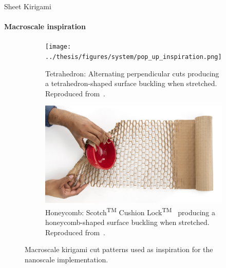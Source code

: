 \documentclass[
	10pt, %
]{beamer}
\begin{document}
%
%
\begin{frame}{Sheet Kirigami}
	\framesubtitle{Macroscale inspiration}
	\vspace*{5mm}
	\begin{figure}[H]
		\centering
		\begin{subfigure}[t]{0.48\textwidth}
			\centering
			\texttt{[image: ../thesis/figures/system/pop\_up\_inspiration.png]}
			\caption{Tetrahedron: Alternating perpendicular cuts producing a tetrahedron-shaped surface buckling when stretched. Reproduced from~\cite{new_pop_up}. }
		\end{subfigure}
		\hfill
		\begin{subfigure}[t]{0.48\textwidth}
			\centering
			\includegraphics[width=\textwidth]{../thesis/figures/system/honeycomb_inspiration.jpg}
			\caption{Honeycomb: Scotch\textsuperscript{TM} Cushion Lock\textsuperscript{TM}~\cite{cushion_wrap} producing a honeycomb-shaped surface buckling when stretched. Reproduced from~\cite{cushion_wrap}.}
		\end{subfigure}
		\hfill
		\caption{Macroscale kirigami cut patterns used as inspiration for the nanoscale implementation.}
	  \end{figure}
\end{frame}
%
%
\end{document}
